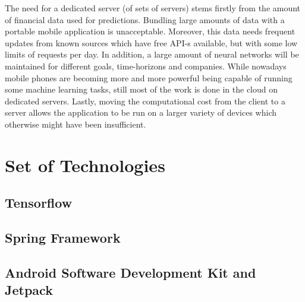 The need for a dedicated server (of sets of servers) stems firstly from the amount of financial data used for predictions. Bundling large amounts of data with a portable mobile application is unacceptable. Moreover, this data needs frequent updates from known sources which have free API-s available, but with some low limits of requests per day. In addition, a large amount of neural networks will be maintained for different goals, time-horizons and companies. While nowadays mobile phones are becoming more and more powerful being capable of running some machine learning tasks, still most of the work is done in the cloud on dedicated servers. Lastly, moving the computational cost from the client to a server allows the application to be run on a larger variety of devices which otherwise might have been insufficient.

\section{Set of Technologies}
\subsection{Tensorflow}

\subsection{Spring Framework}

\subsection{Android Software Development Kit and Jetpack}

